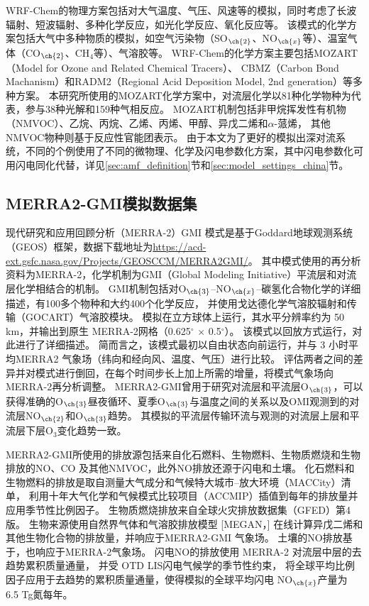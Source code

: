 WRF-Chem的物理方案包括对大气温度、气压、风速等的模拟，同时考虑了长波辐射、短波辐射、多种化学反应，如光化学反应、氧化反应等。
该模式的化学方案包括大气中多种物质的模拟，如空气污染物（SO$_{\ch{2}}$、NO$_{\ch{x}}$等）、温室气体（CO$_{\ch{2}}$、CH$_4$等）、气溶胶等。
WRF-Chem的化学方案主要包括MOZART（Model for Ozone and Related Chemical Tracers）、
CBMZ（Carbon Bond Machanism）和RADM2（Regional Acid Deposition Model, 2nd generation）等多种方案。
本研究所使用的MOZART化学方案中，对流层化学以81种化学物种为代表，参与38种光解和159种气相反应\citep{Emmons.2010}。
MOZART机制包括非甲烷挥发性有机物（NMVOC）、乙烷、丙烷、乙烯、丙烯、甲醇、异戊二烯和$\alpha$-蒎烯，
其他NMVOC物种则基于反应性官能团表示。
由于本文为了更好的模拟出深对流系统，不同的个例使用了不同的微物理、化学及闪电参数化方案，其中闪电参数化可用闪电同化代替，详见\ref{sec:amf_definition}节和\ref{sec:model_settings_china}节。

\subsection{MERRA2-GMI模拟数据集}

现代研究和应用回顾分析（MERRA-2）GMI 模式是基于Goddard地球观测系统（GEOS）框架\citep{Molod.2015}，数据下载地址为\url{https://acd-ext.gsfc.nasa.gov/Projects/GEOSCCM/MERRA2GMI/}。
其中模式使用的再分析资料为MERRA-2\citep{Gelaro.2017}，化学机制为GMI（Global Modeling Initiative）平流层和对流层化学相结合的机制\citep{Duncan.2007,Oman.2013,Nielsen.2017}。
GMI机制包括对O$_{\ch{3}}$--NO$_{\ch{x}}$--碳氢化合物化学的详细描述，有100多个物种和大约400个化学反应，
并使用戈达德化学气溶胶辐射和传输（GOCART）气溶胶模块。
模拟在立方球体上运行，其水平分辨率约为 50 km，并输出到原生 MERRA-2网格（0.625$^{\circ}$ $\times$ 0.5$^{\circ}$）。
该模式以回放方式运行，\citet{Orbe.2017}对此进行了详细描述。
简而言之，该模式最初以自由状态向前运行，并与 3 小时平均MERRA2 气象场（纬向和经向风、温度、气压）进行比较。
评估两者之间的差异并对模式进行倒回，在每个时间步长上加上所需的增量，将模式气象场向MERRA-2再分析调整。
MERRA2-GMI曾用于研究对流层和平流层O$_{\ch{3}}$，可以获得准确的O$_{\ch{3}}$昼夜循环、夏季O$_{\ch{3}}$与温度之间的关系以及OMI观测到的对流层NO$_{\ch{2}}$和O$_{\ch{3}}$趋势\citep{Strode.2017,Ziemke.2017,Ziemke.2019}。
其模拟的平流层传输环流\citep{Orbe.2017}与观测的对流层上层和平流层下层O$_3$变化趋势一致\citep{Wargan.2017,Wargan.2018}。

MERRA2-GMI所使用的排放源包括来自化石燃料、生物燃料、生物质燃烧和生物排放的NO、CO 及其他NMVOC，此外NO排放还源于闪电和土壤。
化石燃料和生物燃料的排放是取自测量大气成分和气候特大城市--放大环境（MACCity）清单\citep{Granier.2011}，
利用十年大气化学和气候模式比较项目（ACCMIP）插值到每年的排放量并应用季节性比例因子\citep{Lamarque.2010}。
生物质燃烧排放来自全球火灾排放数据集（GFED）第4版\citep{Giglio.2013}。
生物来源使用自然界气体和气溶胶排放模型 [MEGAN，\citet{Guenther.1999}]
在线计算异戊二烯和其他生物化合物的排放量，并响应于MERRA2-GMI 气象场。
土壤的NO排放基于\citet{Yienger.1995}，也响应于MERRA-2气象场。
闪电NO的排放使用 MERRA-2 对流层中层的去趋势累积质量通量\citep{Allen.2010}，
并受 OTD LIS闪电气候学的季节性约束\citep{Cecil.2014}，
将全球平均比例因子应用于去趋势的累积质量通量，使得模拟的全球平均闪电 NO$_{\ch{x}}$产量为 6.5 Tg氮每年。
